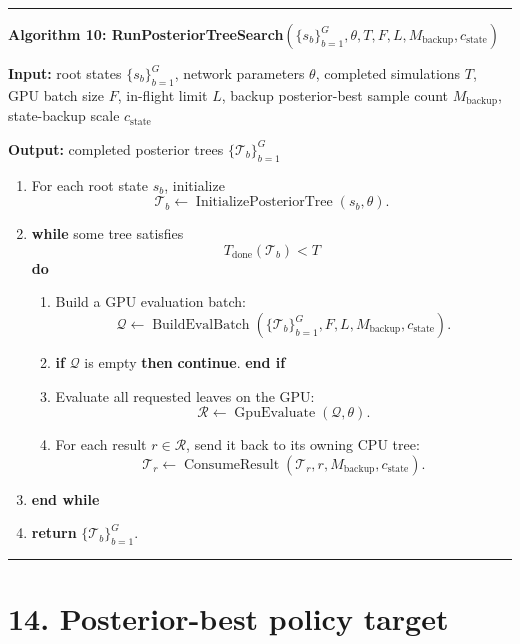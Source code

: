 \documentclass[11pt]{article}
\newcommand{\Tree}{\mathcal{T}}
\newcommand{\ConsumeResult}{\operatorname{ConsumeResult}}
\newcommand{\BuildEvalBatch}{\operatorname{BuildEvalBatch}}
\newcommand{\GpuEvaluate}{\operatorname{GpuEvaluate}}
\newenvironment{algorithmblock}[1]
{
  \par\medskip
  \noindent\hrule\par\smallskip
  \noindent\textbf{#1}
  \par\smallskip
}
{
  \par\smallskip\noindent\hrule\par\medskip
}
\newcommand{\Input}{\textbf{Input: }}
\newcommand{\Output}{\textbf{Output: }}
\newcommand{\Return}{\textbf{return }}
\newcommand{\If}{\textbf{if }}
\newcommand{\Then}{\textbf{ then }}
\newcommand{\EndIf}{\textbf{end if}}
\newcommand{\While}{\textbf{while }}
\newcommand{\EndWhile}{\textbf{end while}}
\newcommand{\Do}{\textbf{ do }}
\newcommand{\Continue}{\textbf{continue}}
\begin{document}
\begin{algorithmblock}{Algorithm 10: RunPosteriorTreeSearch\((\{s_b\}_{b=1}^{G},\theta,T,F,L,M_{\mathrm{backup}},c_{\mathrm{state}})\)}

\Input root states \(\{s_b\}_{b=1}^{G}\), network parameters \(\theta\), completed simulations \(T\), GPU batch size \(F\), in-flight limit \(L\), backup posterior-best sample count \(M_{\mathrm{backup}}\), state-backup scale \(c_{\mathrm{state}}\)

\Output completed posterior trees \(\{\Tree_b\}_{b=1}^{G}\)

\begin{enumerate}[leftmargin=2em]
  \item For each root state \(s_b\), initialize
  \[
  \Tree_b
  \gets
  \operatorname{InitializePosteriorTree}(s_b,\theta).
  \]

  \item \While some tree satisfies
  \[
  T_{\mathrm{done}}(\Tree_b) < T
  \]
  \Do

  \begin{enumerate}[leftmargin=2em]
    \item Build a GPU evaluation batch:
    \[
    \mathcal{Q}
    \gets
    \BuildEvalBatch
    \left(
    \{\Tree_b\}_{b=1}^{G},
    F,
    L,
    M_{\mathrm{backup}},
    c_{\mathrm{state}}
    \right).
    \]

    \item \If \(\mathcal{Q}\) is empty \Then \Continue. \EndIf

    \item Evaluate all requested leaves on the GPU:
    \[
    \mathcal{R}
    \gets
    \GpuEvaluate(\mathcal{Q},\theta).
    \]

    \item For each result \(r\in\mathcal{R}\), send it back to its owning CPU tree:
    \[
    \Tree_{r}
    \gets
    \ConsumeResult(\Tree_{r},r,M_{\mathrm{backup}},c_{\mathrm{state}}).
    \]

  \end{enumerate}

  \item \EndWhile

  \item \Return \(\{\Tree_b\}_{b=1}^{G}\).
\end{enumerate}

\end{algorithmblock}

\section*{14. Posterior-best policy target}
\end{document}

